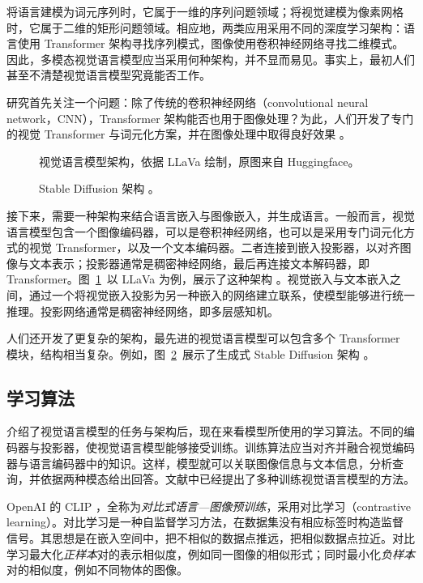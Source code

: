 将语言建模为词元序列时，它属于一维的序列问题领域；将视觉建模为像素网格时，它属于二维的矩形问题领域。相应地，两类应用采用不同的深度学习架构：语言使用 Transformer 架构寻找序列模式，图像使用卷积神经网络寻找二维模式。因此，多模态视觉语言模型应当采用何种架构，并不显而易见。事实上，最初人们甚至不清楚视觉语言模型究竟能否工作。

研究首先关注一个问题：除了传统的卷积神经网络（convolutional neural network，CNN），Transformer 架构能否也用于图像处理？为此，人们开发了专门的视觉 Transformer 与词元化方案，并在图像处理中取得良好效果 \citep{dosovitskiy2020image}。

\begin{figure}
    \centering
    
    \caption{视觉语言模型架构，依据 LLaVa \citep{liu2023visual} 绘制，原图来自 Huggingface。}
    \label{fig:vlm}
\end{figure}

\begin{figure}
    \centering
    
    \caption{Stable Diffusion 架构 \citep{esser2024scaling}。}
    \label{fig:stable}
\end{figure}

接下来，需要一种架构来结合语言嵌入与图像嵌入，并生成语言。一般而言，视觉语言模型包含一个图像编码器，可以是卷积神经网络，也可以是采用专门词元化方式的视觉 Transformer，以及一个文本编码器。二者连接到嵌入投影器，以对齐图像与文本表示；投影器通常是稠密神经网络，最后再连接文本解码器，即 Transformer。图~\ref{fig:vlm}~以 LLaVa 为例，展示了这种架构 \citep{liu2023visual}。视觉嵌入与文本嵌入之间，通过一个将视觉嵌入投影为另一种嵌入的网络建立联系，使模型能够进行统一推理。投影网络通常是稠密神经网络，即多层感知机。

人们还开发了更复杂的架构，最先进的视觉语言模型可以包含多个 Transformer 模块，结构相当复杂。例如，图~\ref{fig:stable}~展示了生成式 Stable Diffusion 架构 \citep{esser2024scaling,weng2021diffusion,yang2023diffusion}。

\subsection{学习算法}
介绍了视觉语言模型的任务与架构后，现在来看模型所使用的学习算法。不同的编码器与投影器，使视觉语言模型能够接受训练。训练算法应当对齐并融合视觉编码器与语言编码器中的知识。这样，模型就可以关联图像信息与文本信息，分析查询，并依据两种模态给出回答。文献中已经提出了多种训练视觉语言模型的方法。

OpenAI 的 CLIP \citep{radford2021learning}，全称为{\em 对比式语言—图像预训练}，采用对比学习（contrastive learning）。对比学习是一种自监督学习方法，在数据集没有相应标签时构造监督信号。其思想是在嵌入空间中，把不相似的数据点推远，把相似数据点拉近。对比学习最大化{\em 正样本}对的表示相似度，例如同一图像的相似形式；同时最小化{\em 负样本}对的相似度，例如不同物体的图像。

